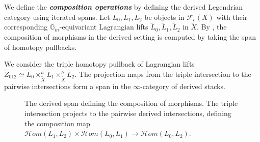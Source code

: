 \documentclass[reqno]{amsart}
\newcommand{\bfem}[1]{\textbf{\textit{#1}}}
\newcommand{\Gm}{\mathbb{G}_m}
\begin{document}
We define the \bfem{composition operations} by defining the derived Legendrian category using iterated spans. Let $L_{0}, L_{1}, L_{2}$ be objects in $\mathcal{F}_{c}(X)$ with their corresponding $\Gm$-equivariant Lagrangian lifts $\widetilde{L}_{0}, \widetilde{L}_{1}, \widetilde{L}_{2}$ in $\widetilde{X}$. By \cite[Section 2]{CHS}, the composition of morphisms in the derived setting is computed by taking the span of homotopy pullbacks.

We consider the triple homotopy pullback of Lagrangian lifts $\widetilde{Z}_{012} \simeq \widetilde{L}_{0} \times_{\widetilde{X}}^{h} \widetilde{L}_{1} \times_{\widetilde{X}}^{h} \widetilde{L}_{2}$. The projection maps from the triple intersection to the pairwise intersections form a span in the $\infty$-category of derived stacks.

\begin{figure}[htbp]
    \centering
    \caption{The derived span defining the composition of morphisms. The triple intersection projects to the pairwise derived intersections, defining the composition map $\mathcal{H}om(L_{1}, L_{2}) \times \mathcal{H}om(L_{0}, L_{1}) \to \mathcal{H}om(L_{0}, L_{2})$.}
\end{figure}
\end{document}
